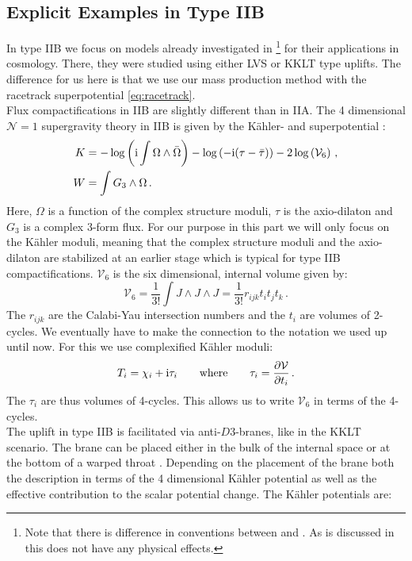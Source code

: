 \documentclass[a4paper,12pt,twoside,openright]{report}
\newcommand{\be}{\begin{equation}}
\newcommand{\ee}{\end{equation}}
\newcommand{\bea}{\begin{equation}\begin{aligned}}
\newcommand{\eea}{\end{aligned}\end{equation}}
\def\rmi{{\rm i}}
\begin{document}
\subsection{Explicit Examples in Type IIB}
In type IIB we focus on models already investigated in \cite{Cicoli:2008va,Cicoli:2008gp,Burgess:2016owb,Kallosh:2017wku,Bobkov:2010rf}\footnote{Note that there is difference in conventions between \cite{Cicoli:2008va,Cicoli:2008gp,Burgess:2016owb,Kallosh:2017wku,Bobkov:2010rf} and \cite{Cribiori:2019drf}. As is discussed in \cite{Cribiori:2019drf} this does not have any physical effects.}  for their applications in cosmology. There, they were studied using either LVS or KKLT type uplifts. The difference for us here is that we use our mass production method with the racetrack superpotential \eqref{eq:racetrack}.\\
Flux compactifications in IIB are slightly different than in IIA. The 4 dimensional $\mathcal{N}=1$ supergravity theory in IIB is given by the Kähler- and superpotential \cite{Grimm:2004uq}:
\bea 
K &= -\log\left(\rmi \int \Omega \wedge \bar{\Omega} \right) - \log\left(-\rmi (\tau -\bar{\tau})\right) - 2 \log \left(\mathcal{V}_6\right)\,,\\
W &= \int G_3 \wedge \Omega\,.
\eea
Here, $\Omega$ is a function of the complex structure moduli, $\tau$ is the axio-dilaton and $G_3$ is a complex 3-form flux. For our purpose in this part we will only focus on the Kähler moduli, meaning that the complex structure moduli and the axio-dilaton are stabilized at an earlier stage which is typical for type IIB compactifications. $\mathcal{V}_6$ is the six dimensional, internal volume given by:
\be 
\mathcal{V}_6 = \frac{1}{3!} \int J \wedge J \wedge J=\frac{1}{3!} r_{ijk}t_i t_j t_k\,.
\ee
The $r_{ijk}$ are the Calabi-Yau intersection numbers and the $t_i$ are volumes of 2-cycles. We eventually have to make the connection to the notation we used up until now. For this we use complexified Kähler moduli:
\be 
T_i = \chi_i + \rmi \tau_i \qquad \text{where} \qquad \tau_i = \frac{\partial \mathcal{V}}{\partial t_i}\,.
\ee
The $\tau_i$ are thus volumes of 4-cycles. This allows us to write $\mathcal{V}_6$ in terms of the 4-cycles.\\
The uplift in type IIB is facilitated via anti-$D3$-branes, like in the KKLT scenario. The brane can be placed either in the bulk of the internal space or at the bottom of a warped throat \cite{Kallosh:2017wku}. Depending on the placement of the brane both the description in terms of the 4 dimensional Kähler potential as well as the effective contribution to the scalar potential change. The Kähler potentials are:
\end{document}
